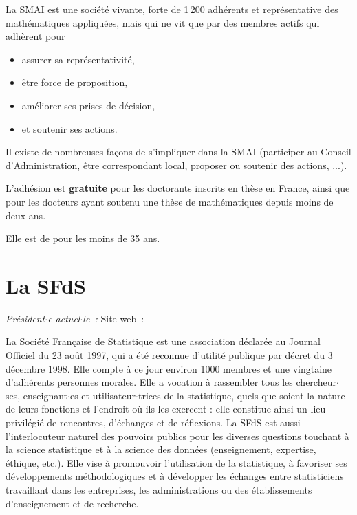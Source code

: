 La SMAI est une soci\'et\'e vivante, forte de 1\,200 adh\'erents
et repr\'esentative des math\'ematiques appliqu\'ees, mais
qui ne vit que par des membres actifs qui adh\`erent pour
\begin{itemize}%
    \item assurer sa repr\'esentativit\'e,
    \item \^etre force de proposition,
    \item am\'eliorer ses prises de d\'ecision,
    \item et soutenir ses actions.
\end{itemize}
Il existe de nombreuses fa\c cons de s'impliquer dans la SMAI
(participer au Conseil d'Administration, \^etre correspondant local,
proposer ou soutenir des actions, ...).

L'adh\'esion est \textbf{gratuite} pour les doctorants inscrits en th\`ese en France, 
ainsi que pour les docteurs ayant soutenu une th\`ese de math\'ematiques depuis moins de deux ans.

Elle est de  pour les moins de 35 ans.

\section{La SFdS}

\emph{Pr\'esident$\cdot$e actuel$\cdot$le~: } \hfill Site web~: 
\smallskip

La Soci\'et\'e Fran\c{c}aise de Statistique est une association d\'eclar\'ee au Journal Officiel du 23 ao\^ut 1997, qui a \'et\'e reconnue d'utilit\'e publique par d\'ecret du 3 d\'ecembre 1998. Elle compte \`a ce jour environ 1000 membres et une vingtaine d'adh\'erents personnes morales. Elle a vocation \`a rassembler tous les chercheur$\cdot$ses, enseignant$\cdot$es et utilisateur$\cdot$trices de la statistique, quels que soient la nature de leurs fonctions et l'endroit o\`u ils les exercent : elle constitue ainsi un lieu privil\'egi\'e de rencontres, d'\'echanges et de r\'eflexions. La SFdS est aussi l'interlocuteur naturel des pouvoirs publics pour les diverses questions touchant \`a la science statistique et \`a la science des donn\'ees (enseignement, expertise, \'ethique, etc.). Elle vise \`a promouvoir l'utilisation de la statistique, \`a favoriser ses d\'eveloppements m\'ethodologiques et \`a d\'evelopper les \'echanges entre statisticiens travaillant dans les entreprises, les administrations ou des \'etablissements d'enseignement et de recherche.

